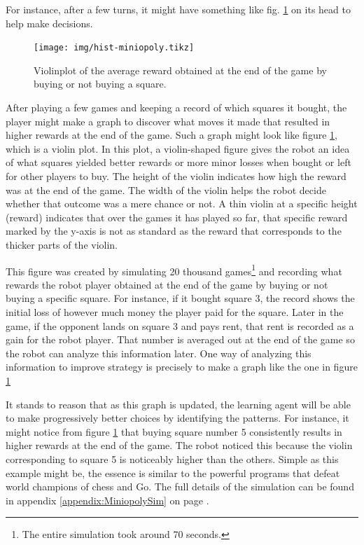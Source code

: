 For instance, after a few turns, it might have something like fig.
\ref{fig:violinplot} on its head to help make decisions.

\begin{figure}
\centering
\texttt{[image: img/hist-miniopoly.tikz]}
\caption{Violinplot of the average reward obtained at the end 
of the game by buying or not buying a square.}
\label{fig:violinplot}
\end{figure}

After playing a few games and keeping a record of which squares it bought, the
player might make a graph to discover what moves it made that resulted in higher
rewards at the end of the game. Such a graph might look like figure
\ref{fig:violinplot}, which is a violin plot. In this plot, a violin-shaped
figure gives the robot an idea of what squares yielded better rewards or more
minor losses when bought or left for other players to buy. The height of the
violin indicates how high the reward was at the end of the game. The width of
the violin helps the robot decide whether that outcome was a mere chance or not.
A thin violin at a specific height (reward) indicates that over the games it has
played so far, that specific reward marked by the y-axis is not as standard as
the reward that corresponds to the thicker parts of the violin.

This figure was created by simulating 20 thousand games\footnote{The entire
simulation took around 70 seconds.} and recording what rewards the robot player
obtained at the end of the game by buying or not buying a specific square. For
instance, if it bought square 3, the record shows the initial loss of however
much money the player paid for the square. Later in the game, if the opponent
lands on square 3 and pays rent, that rent is recorded as a gain for the robot
player. That number is averaged out at the end of the game so the robot can
analyze this information later. One way of analyzing this information to improve
strategy is precisely to make a graph like the one in figure
\ref{fig:violinplot}

It stands to reason that as this graph is updated, the learning agent will be
able to make progressively better choices by identifying the patterns. For
instance, it might notice from figure \ref{fig:violinplot} that buying square
number 5 consistently results in higher rewards at the end of the game. The
robot noticed this because the violin corresponding to square 5 is noticeably
higher than the others. Simple as this example might be, the essence is similar
to the powerful programs that defeat world champions of chess and Go. The full
details of the simulation can be found in appendix
\ref{appendix:MiniopolySim} on page
\pageref{appendix:MiniopolySim}.

